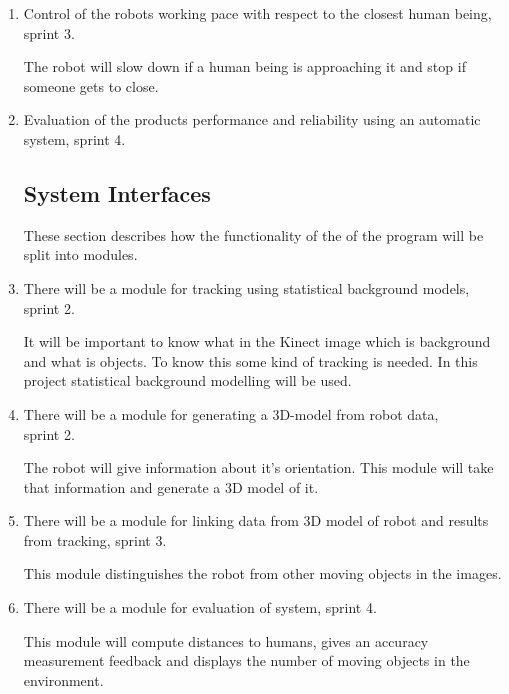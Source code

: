 \documentclass[10pt,a4paper]{article}
\begin{document}
\begin{enumerate}
\item Control of the robots working pace with respect to the closest human being, sprint 3.

{\addtolength{\leftskip}{5mm}The robot will slow down if a human being is approaching it and stop if someone gets to close.\par}

\item Evaluation of the products performance and reliability using an automatic system, sprint 4.

\subsection{System Interfaces}
These section describes how the functionality of the of the program will be split into modules.

\item There will be a module for tracking using statistical background models, sprint 2.

{\addtolength{\leftskip}{5mm}It will be important to know what in the Kinect image which is background and what is objects. To know this some kind of tracking is needed. In this project statistical background modelling will be used.\par}
\item There will be a module for generating a 3D-model from robot data,\\ sprint 2.
 
{\addtolength{\leftskip}{5mm}The robot will give information about it’s orientation. This module will take that information and generate a 3D model of it.\par}
 
 \item There will be a module for linking data from 3D model of robot and results from tracking, sprint 3.

{\addtolength{\leftskip}{5mm}This module distinguishes the robot from other moving objects in the images.\par}

\item There will be a module for evaluation of system, sprint 4.

{\addtolength{\leftskip}{5mm}This module will compute distances to humans, gives an accuracy measurement feedback and displays the number of moving objects in the environment. 
\par}


\end{enumerate}
\end{document}
